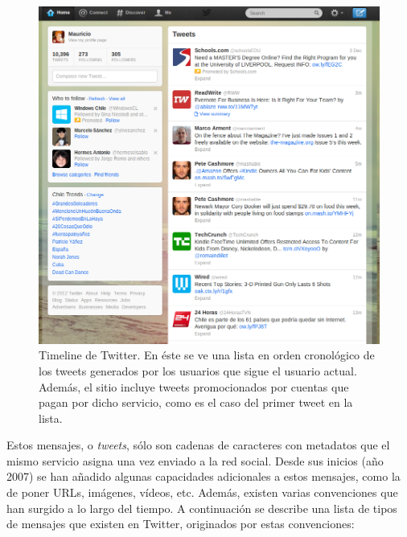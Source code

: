 \begin{figure}[h!b]
  \centering
  \includegraphics[width=12cm]{./img/twitter.png}
  \caption[Timeline de Twitter.]
   {Timeline de Twitter. En éste se ve una lista en orden cronológico
  de los tweets generados por los usuarios que sigue el usuario
  actual. Además, el sitio incluye tweets promocionados por cuentas
  que pagan por dicho servicio, como es el caso del primer tweet en la
  lista.}
\end{figure}

   Estos mensajes, o \emph{tweets}, sólo son cadenas de caracteres con
   metadatos que el mismo servicio asigna una vez enviado a la red
   social. Desde sus inicios (año 2007) se han añadido algunas capacidades
   adicionales a estos mensajes, como la de poner URLs, imágenes,
   vídeos, etc. Además, existen varias convenciones que han surgido a
   lo largo del tiempo. A continuación se describe una lista de tipos
   de mensajes que existen en Twitter, originados por estas convenciones:

